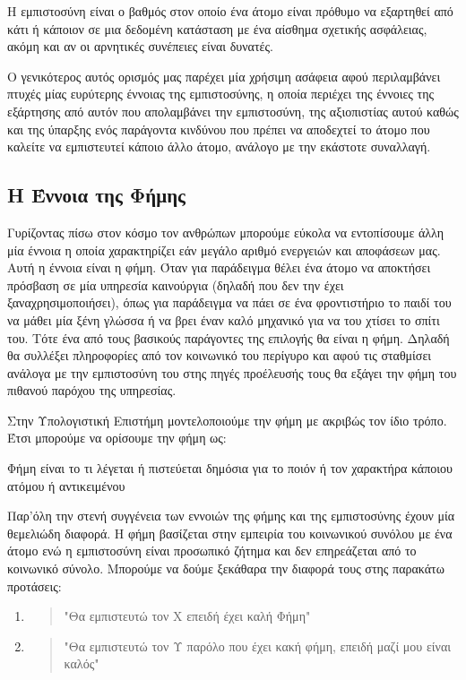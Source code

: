 \begin{decision}
Η εμπιστοσύνη είναι ο βαθμός στον οποίο ένα άτομο είναι πρόθυμο να εξαρτηθεί από κάτι ή κάποιον σε μια δεδομένη κατάσταση με ένα αίσθημα σχετικής ασφάλειας, ακόμη και αν οι αρνητικές συνέπειες είναι δυνατές.
\end{decision}

Ο γενικότερος αυτός ορισμός μας παρέχει μία χρήσιμη ασάφεια αφού περιλαμβάνει πτυχές μίας ευρύτερης έννοιας της εμπιστοσύνης, η οποία περιέχει της έννοιες της εξάρτησης από αυτόν που απολαμβάνει την εμπιστοσύνη, της αξιοπιστίας αυτού καθώς και της ύπαρξης ενός παράγοντα κινδύνου που πρέπει να αποδεχτεί το άτομο που καλείτε να εμπιστευτεί κάποιο άλλο άτομο, ανάλογο με την εκάστοτε συναλλαγή.

\subsection{Η Έννοια της Φήμης}

Γυρίζοντας πίσω στον κόσμο τον ανθρώπων μπορούμε εύκολα να εντοπίσουμε άλλη μία έννοια η οποία χαρακτηρίζει εάν μεγάλο αριθμό ενεργειών και αποφάσεων μας. Αυτή η έννοια είναι η φήμη. Όταν για παράδειγμα θέλει ένα άτομο να αποκτήσει πρόσβαση σε μία υπηρεσία καινούργια (δηλαδή που δεν την έχει ξαναχρησιμοποιήσει), όπως για παράδειγμα να πάει σε ένα φροντιστήριο το παιδί του να μάθει μία ξένη γλώσσα ή να βρει έναν καλό μηχανικό για να του χτίσει το σπίτι του. Τότε ένα από τους βασικούς παράγοντες της επιλογής θα είναι η φήμη. Δηλαδή θα συλλέξει πληροφορίες από τον κοινωνικό του περίγυρο και αφού τις σταθμίσει ανάλογα με την εμπιστοσύνη του στης πηγές προέλευσής τους θα εξάγει την φήμη του πιθανού παρόχου της υπηρεσίας.

Στην Υπολογιστική Επιστήμη μοντελοποιούμε την φήμη με ακριβώς τον ίδιο τρόπο. Έτσι μπορούμε να ορίσουμε την φήμη ως:
\begin{reputation}
Φήμη είναι το τι λέγεται ή πιστεύεται δημόσια για το ποιόν ή τον χαρακτήρα κάποιου ατόμου ή αντικειμένου
\end{reputation}

Παρ'όλη την στενή συγγένεια των εννοιών της φήμης και της εμπιστοσύνης έχουν μία θεμελιώδη διαφορά. Η φήμη βασίζεται στην εμπειρία του κοινωνικού συνόλου με ένα άτομο ενώ η εμπιστοσύνη είναι προσωπικό ζήτημα και δεν επηρεάζεται από το κοινωνικό σύνολο. Μπορούμε να δούμε ξεκάθαρα την διαφορά τους στης παρακάτω προτάσεις:
\begin{enumerate}
\item \begin{quote} 
"Θα εμπιστευτώ τον Χ επειδή έχει καλή Φήμη"
\end{quote}
\item \begin{quote}
 "Θα εμπιστευτώ τον Υ παρόλο που έχει κακή φήμη, επειδή μαζί μου είναι καλός"
\end{quote}
\end{enumerate}


